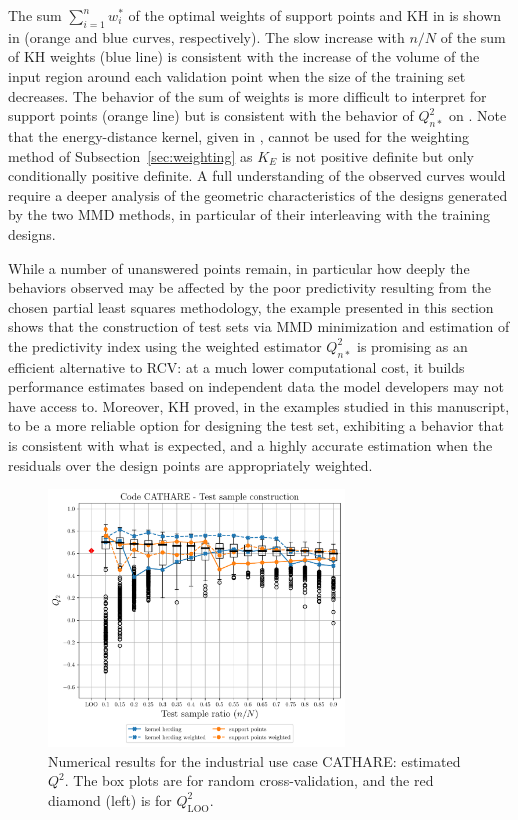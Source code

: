 The sum $\sum_{i=1}^n w_i^*$ of the optimal weights of support points and KH in  is shown in  (orange and blue curves, respectively). 
The slow increase with $n/N$ of the sum of KH weights (blue line) is consistent with the increase of the volume of the input region around each validation point when the size of the training set decreases. 
The behavior of the sum of weights is more difficult to interpret for support points (orange line) but is consistent with the behavior of $Q_{n*}^2$ on . 
Note that the energy-distance kernel, given in , cannot be used for the weighting method of Subsection~\ref{sec:weighting} as $K_E$ is not positive definite but only conditionally positive definite. 
A full understanding of the observed curves would require a deeper analysis of the geometric characteristics of the designs generated by the two MMD methods, in particular of their interleaving with the training designs. %

While a number of unanswered points remain, in particular how deeply the behaviors observed may be affected by the poor predictivity resulting from the chosen partial least squares methodology, the example presented in this section shows that the construction of test sets via MMD minimization and estimation of the predictivity index using the weighted estimator $Q_{n*}^2$ is promising as an efficient alternative to RCV: at a much lower computational cost, it builds performance estimates based on independent data the model developers may not have access to. 
Moreover, KH proved, in the examples studied in this manuscript, to be a more reliable option for designing the test set, exhibiting a behavior that is consistent with what is expected, and a highly accurate estimation when the residuals over the design points are appropriately weighted.

\begin{figure}
  \centering
  \includegraphics[width=0.7\textwidth]{./part2/figures/SIS/cathareC2.pdf}
  \caption{Numerical results for the industrial use case CATHARE: estimated $Q^2$. The box plots are for random cross-validation, and the red diamond (left) is for $Q^2_{\mathrm{LOO}}$.}
  \label{fig:cathareC2_benchmark}
\end{figure}

